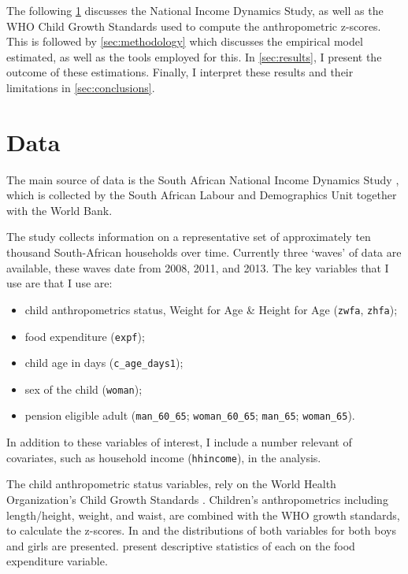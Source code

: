 \documentclass[a4paper,british]{article}\usepackage[]{graphicx}\usepackage[]{color}
\newcommand{\code}[1]{\texttt{#1}}
\begin{document}
The following \ref{sec:data} discusses the National Income Dynamics
Study, as well as the WHO Child Growth Standards used to compute the
anthropometric z-scores. This is followed by \ref{sec:methodology}
which discusses the empirical model estimated, as well as the tools
employed for this. In \ref{sec:results}, I present the outcome of
these estimations. Finally, I interpret these results and their limitations
in \ref{sec:conclusions}.


\section{Data}

\label{sec:data}The main source of data is the South African National
Income Dynamics Study \citep[NIDS,][]{saldru2008nids,saldru2012nids,saldru2013nids},
which is collected by the South African Labour and Demographics Unit
together with the World Bank.

The study collects information on a representative set of approximately
ten thousand South-African households over time. Currently three `waves'
of data are available, these waves date from 2008, 2011, and 2013.
The key variables that I use are that I use are: 
\begin{itemize}
\item child anthropometrics status, Weight for Age \& Height for Age (\code{zwfa},
\code{zhfa});
\item food expenditure (\code{expf});
\item child age in days (\code{c\_age\_days1});
\item sex of the child (\code{woman}); 
\item pension eligible adult (\code{man\_60\_65}; \code{woman\_60\_65};
\code{man\_65}; \code{woman\_65}).
\end{itemize}
In addition to these variables of interest, I include a number relevant
of covariates, such as household income (\code{hhincome}), in the
analysis.

The child anthropometric status variables, rely on the World Health
Organization's Child Growth Standards \citep{who2006child}. Children's
anthropometrics including length/height, weight, and waist, are combined
with the WHO growth standards, to calculate the z-scores. In 
and the distributions of both variables for both
boys and girls are presented.  present descriptive
statistics of each on the food expenditure variable. 
\end{document}

